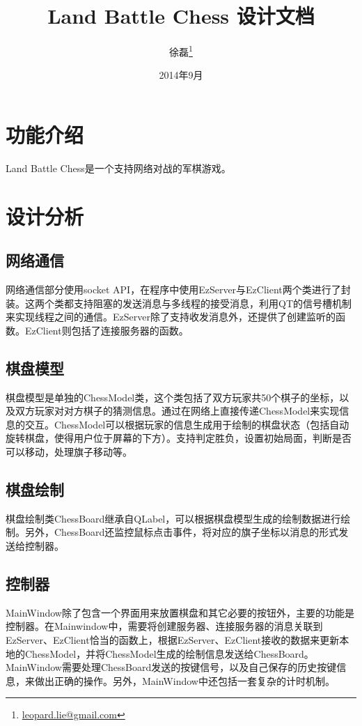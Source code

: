\documentclass[12pt]{article}
\begin{document}
\title{Land Battle Chess 设计文档}

\author{徐磊\thanks{\href{mailto:leopard.lie@gmail.com}{leopard.lie@gmail.com}}}

\date{2014年9月}
\maketitle

\section{功能介绍}
Land Battle Chess是一个支持网络对战的军棋游戏。

\section{设计分析}
\subsection{网络通信}
网络通信部分使用socket API，在程序中使用EzServer与EzClient两个类进行了封装。这两个类都支持阻塞的发送消息与多线程的接受消息，利用QT的信号槽机制来实现线程之间的通信。EzServer除了支持收发消息外，还提供了创建监听的函数。EzClient则包括了连接服务器的函数。
\subsection{棋盘模型}
棋盘模型是单独的ChessModel类，这个类包括了双方玩家共50个棋子的坐标，以及双方玩家对对方棋子的猜测信息。通过在网络上直接传递ChessModel来实现信息的交互。ChessModel可以根据玩家的信息生成用于绘制的棋盘状态（包括自动旋转棋盘，使得用户位于屏幕的下方）。支持判定胜负，设置初始局面，判断是否可以移动，处理旗子移动等。
\subsection{棋盘绘制}
棋盘绘制类ChessBoard继承自QLabel，可以根据棋盘模型生成的绘制数据进行绘制。另外，ChessBoard还监控鼠标点击事件，将对应的旗子坐标以消息的形式发送给控制器。
\subsection{控制器}
MainWindow除了包含一个界面用来放置棋盘和其它必要的按钮外，主要的功能是控制器。在Mainwindow中，需要将创建服务器、连接服务器的消息关联到EzServer、EzClient恰当的函数上，根据EzServer、EzClient接收的数据来更新本地的ChessModel，并将ChessModel生成的绘制信息发送给ChessBoard。MainWindow需要处理ChessBoard发送的按键信号，以及自己保存的历史按键信息，来做出正确的操作。另外，MainWindow中还包括一套复杂的计时机制。
\end{document}
